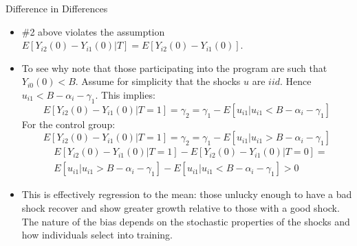 \documentclass[xcolor=pdftex,dvipsnames,table,mathserif,aspectratio=169]{beamer}
\begin{document}
\begin{frame}{Difference in Differences}
\small
\begin{itemize}
\item  \#2 above violates the assumption {\small $E[Y_{i2}(0) - Y_{i1}(0) | T] = E[Y_{i2}(0) - Y_{i1}(0)]$}. 
\item To see why note that those participating into the program are such
that {\small $Y_{i0}(0) < B$}. Assume for simplicity that the shocks {\small $u$} are {\small $iid$}. Hence {\small $u_{i1} < B- \alpha_i - \gamma_1$}. 
This implies: 
{\small $$E[Y_{i2}(0)- Y_{i1}(0) | T=1] = \gamma_2 = \gamma_1 - E[u_{i1}| u_{i1} <  B-\alpha_i - \gamma_1]$$}
For the control group:
{\small $$E[Y_{i2}(0) - Y_{i1}(0) | T=1] = \gamma_2 = \gamma_1 - E[u_{i1}| u_{i1} >  B-\alpha_i - \gamma_1]$$}
\vspace{-1cm}
\begin{align*}
& E[Y_{i2}(0) - Y_{i1}(0) | T=1] - E[Y_{i2}(0) - Y_{i1}(0) | T=0] =\\
&  E[u_{i1} | u_{i1} >  B-\alpha_i - \gamma_1] - E[u_{i1} | u_{i1} < B-\alpha_i - \gamma_1]  >0
  \end{align*}
 \item This is effectively regression to the mean: those unlucky enough to have a bad shock recover and show greater growth relative to those with a good shock. The nature of the bias depends on the stochastic properties of the shocks and how individuals select into training.
\end{itemize}
\end{frame} 

%
\end{document}
